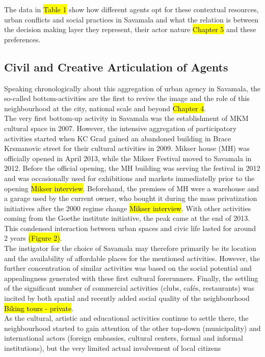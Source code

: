 \documentclass[11pt]{report}
\begin{document}
The data in \hl{Table 1} show how different agents opt for these contextual resources, urban conflicts and social practices in Savamala and what the relation is between the decision making layer they represent, their actor nature \hl{Chapter 5} and these preferences. 

\subsection{Civil and Creative Articulation of Agents}

Speaking chronologically about this aggregation of urban agency in Savamala, the so-called bottom-activities are the first to revive the image and the role of this neighbourhood at the city, national scale and beyond \hl{Chapter 4}.
\\
The very first bottom-up activity in Savamala was the establishment of MKM cultural space in 2007. However, the intensive aggregation of participatory activities started when KC Grad gained an abandoned building in Brace Krsmanovic street for their cultural activities in 2009.
Mikser house (MH) was officially opened in April 2013, while the Mikser Festival moved to Savamala in 2012. Before the official opening, the MH building was serving the festival in 2012 and was occasionally used for exhibitions and markets immediatelly prior to the opening \hl{Mikser interview}.
Beforehand, the premises of MH were a warehouse and a garage used by the current owner, who bought it during the mass privatization initiatives after the 2000 regime change \hl{Mikser interview}.
With other activities coming from the Goethe institute initiative, the peak came at the end of 2013. This condensed interaction between urban spaces and civic life lasted for around 2 years \hl{(Figure 2)}.
\\
The instigator for the choice of Savamala may therefore primarily be its location and the availability of affordable places for the mentioned activities.
However, the further concentration of similar activities was based on the social potential and appealingness generated with these first cultural forerunners. Finally, the settling of the significant number of commercial activities (clubs, cafés, restaurants) was incited by both spatial and recently added social quality of the neighbourhood \hl{Biking tours - private}.
\\
As the cultural, artistic and educational activities continue to settle there, the neighbourhood started to gain attention of the other top-down (municipality) and international actors (foreign embassies, cultural centers, formal and informal institutions), but the very limited actual involvement of local citizens
\end{document}

